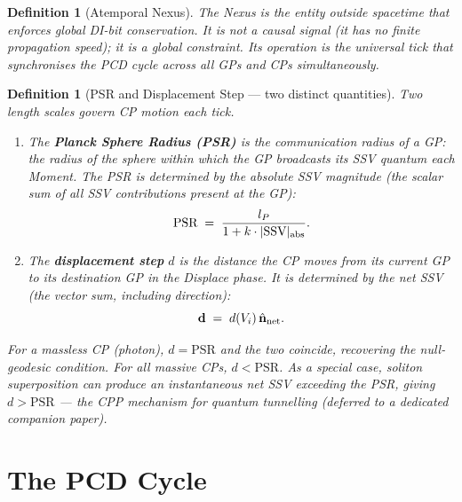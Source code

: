 \documentclass[12pt]{article}
\newtheorem{definition}[theorem]{Definition}
\begin{document}
\begin{definition}[Atemporal Nexus]
The Nexus is the entity outside spacetime that enforces global DI-bit
conservation.  It is not a causal signal (it has no finite propagation speed);
it is a \emph{global constraint}.  Its operation is the universal tick that
synchronises the PCD cycle across all GPs and CPs simultaneously.
\end{definition}

\begin{definition}[PSR and Displacement Step --- two distinct quantities]
\label{def:psr-disp}
Two length scales govern CP motion each tick.
\begin{enumerate}[label=(\roman*)]
  \item The \textbf{Planck Sphere Radius (PSR)} is the communication radius
    of a GP: the radius of the sphere within which the GP broadcasts its SSV
    quantum each Moment.  The PSR is determined by the \emph{absolute} SSV
    magnitude (the scalar sum of all SSV contributions present at the GP):
    \begin{equation}
      \text{PSR} \;=\; \frac{l_P}{1 + k\cdot|\text{SSV}|_{\rm abs}}.
      \label{eq:PSR-def}
    \end{equation}
  \item The \textbf{displacement step} $d$ is the distance the CP moves from
    its current GP to its destination GP in the Displace phase.  It is
    determined by the \emph{net} SSV (the vector sum, including direction):
    \begin{equation}
      \mathbf{d} \;=\; d(V_i)\,\hat{\mathbf{n}}_{\rm net}.
      \label{eq:disp}
    \end{equation}
\end{enumerate}
For a massless CP (photon), $d = \text{PSR}$ and the two coincide, recovering
the null-geodesic condition.  For all massive CPs, $d < \text{PSR}$.  As a
special case, soliton superposition can produce an instantaneous net SSV
exceeding the PSR, giving $d > \text{PSR}$ --- the CPP mechanism for quantum
tunnelling (deferred to a dedicated companion paper).
\end{definition}

\section{The PCD Cycle}
\label{sec:pcd}
\end{document}
